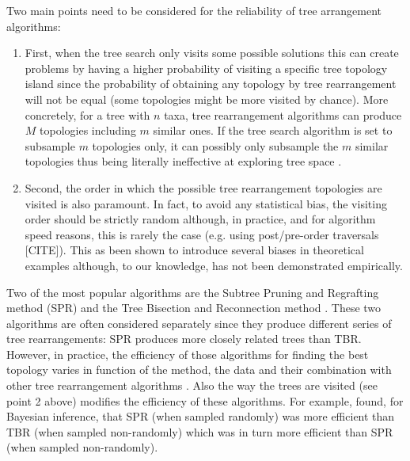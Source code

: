 \documentclass[12pt,letterpaper]{article}
\begin{document}
Two main points need to be considered for the reliability of tree arrangement algorithms:
\begin{enumerate}
    \item First, when the tree search only visits some possible solutions this can create problems by having a higher probability of visiting a specific tree topology island since the probability of obtaining any topology by tree rearrangement will not be equal (some topologies might be more visited by chance).
    More concretely, for a tree with $n$ taxa, tree rearrangement algorithms can produce $M$ topologies including $m$ similar ones.
    If the tree search algorithm is set to subsample $m$ topologies only, it can possibly only subsample the $m$ similar topologies thus being literally ineffective at exploring tree space \citep{allen2001subtree}.
    \item Second, the order in which the possible tree rearrangement topologies are visited is also paramount.
    In fact, to avoid any statistical bias, the visiting order should be strictly random \citep{goloboff2014bias} although, in practice, and for algorithm speed reasons, this is rarely the case (e.g. using post/pre-order traversals [CITE]).
    This as been shown to introduce several biases in theoretical examples \citep{goloboff2014bias} although, to our knowledge, has not been demonstrated empirically.
\end{enumerate}

Two of the most popular algorithms are the Subtree Pruning and Regrafting method (SPR) and the Tree Bisection and Reconnection method \citep[TBR - see Fig. \ref{Figure_SPR} and \ref{Figure_TBR} and text below for detailled description;][]{allen2001subtree,felsenstein2004inferring}.
These two algorithms are often considered separately since they produce different series of tree rearrangements: SPR produces more closely related trees than TBR.
However, in practice, the efficiency of those algorithms for finding the best topology varies in function of the method, the data and their combination with other tree rearrangement algorithms \citep[e.g.][]{morrison2007increasing,lakner2008efficiency}.
Also the way the trees are visited (see point 2 above) modifies the efficiency of these algorithms.
For example, \cite{lakner2008efficiency} found, for Bayesian inference, that SPR (when sampled randomly) was more efficient than TBR (when sampled non-randomly) which was in turn more efficient than SPR (when sampled non-randomly).
\end{document}
